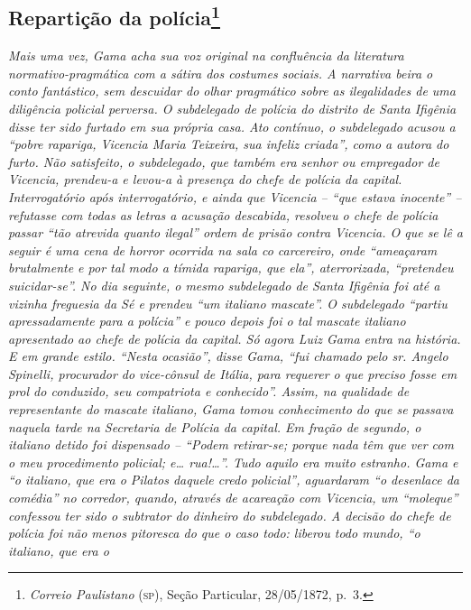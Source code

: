 {\begin{flushright}
\chapter{Repartição da polícia\footnote{\emph{Correio Paulistano} (\textsc{sp}), Seção Particular,
  28/05/1872, p.~3.}} %

\begin{didascalia}
\emph{Mais uma vez, Gama acha sua voz original na confluência da
literatura normativo-pragmática com a sátira dos costumes sociais. A
narrativa beira o conto fantástico, sem descuidar do olhar pragmático
sobre as ilegalidades de uma diligência policial perversa. O subdelegado
de polícia do distrito de Santa Ifigênia disse ter sido furtado em sua
própria casa. Ato contínuo, o subdelegado acusou a ``pobre rapariga,
Vicencia Maria Teixeira, sua infeliz criada'', como a autora do furto.
Não satisfeito, o subdelegado, que também era senhor ou empregador de
Vicencia, prendeu-a e levou-a à presença do chefe de polícia da capital.
Interrogatório após interrogatório, e ainda que Vicencia -- ``que estava
inocente'' -- refutasse com todas as letras a acusação descabida,
resolveu o chefe de polícia passar ``tão atrevida quanto ilegal'' ordem de
prisão contra Vicencia. O que se lê a seguir é uma cena de horror
ocorrida na sala co carcereiro, onde ``ameaçaram brutalmente e por tal
modo a tímida rapariga, que ela'', aterrorizada, ``pretendeu suicidar-se''.
No dia seguinte, o mesmo subdelegado de Santa Ifigênia foi até a vizinha
freguesia da Sé e prendeu ``um italiano mascate''. O subdelegado ``partiu
apressadamente para a polícia'' e pouco depois foi o tal mascate italiano
apresentado ao chefe de polícia da capital. Só agora Luiz Gama entra na
história. E em grande estilo. ``Nesta ocasião'', disse Gama, ``fui chamado
pelo sr. Angelo Spinelli, procurador do vice-cônsul de Itália, para
requerer o que preciso fosse em prol do conduzido, seu compatriota e
conhecido''. Assim, na qualidade de representante do mascate italiano,
Gama tomou conhecimento do que se passava naquela tarde na Secretaria de
Polícia da capital. Em fração de segundo, o italiano detido foi
dispensado -- ``Podem retirar-se; porque nada têm que ver com o meu
procedimento policial; e\ldots{} rua!\ldots{}''. Tudo aquilo era muito estranho.
Gama e ``o italiano, que era o Pilatos daquele credo policial'',
aguardaram ``o desenlace da comédia'' no corredor, quando, através de
acareação com Vicencia, um ``moleque'' confessou ter sido o subtrator do
dinheiro do subdelegado. A decisão do chefe de polícia foi não menos
pitoresca do que o caso todo: liberou todo mundo, ``o italiano, que era o
}
\end{didascalia}
\end{flushright}}
